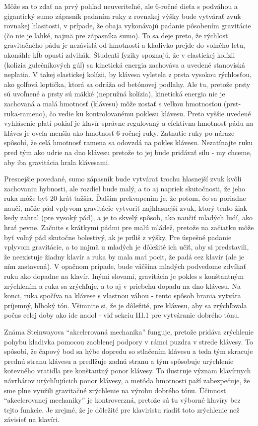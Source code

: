 Môže sa to zdať na prvý pohľad neuveriteľné, ale 6-ročné dieťa s podváhou a gigantický sumo zápasník padaním ruky z rovnakej výšky bude vytvárať zvuk rovnakej hlasitosti, v prípade, že obaja vykonávajú padanie pôsobením gravitácie (čo nie je ľahké, najmä pre zápasníka sumo). To sa deje preto, že rýchlosť gravitačného pádu je nezávislá od hmotnosti a kladivko prejde do voľného letu, akonáhle kĺb opustí zdvihák. Študenti fyziky spoznajú, že v elastickej kolízii (kolízia gulečníkových gúľ) sa kinetická energia zachováva a uvedené stanoviská neplatia. V takej elastickej kolízii, by klávesa vyletela z prsta vysokou rýchlosťou, ako golfová loptička, ktorá sa odráža od betónovej podlahy. Ale tu, pretože prsty sú uvoľnené a prsty sú mäkké (nepružná kolízia), kinetická energia nie je zachovaná a malá hmotnosť (klávesu) môže zostať s veľkou hmotnosťou (prst-ruka-rameno), čo vedie ku  kontrolovanému poklesu klávesu. Preto vyššie uvedené vyhlásenie platí pokiaľ je klavír správne regulovaný a efektívna hmotnosť pádu na kláves je oveľa menšia ako hmotnosť 6-ročnej ruky. Zatnutie ruky po náraze spôsobí, že celá hmotnosť ramena sa odovzdá na pokles klávesu. Nezatínajte ruku pred tým ako udrie na dno klávesu pretože to jej bude pridávať silu - my chceme, aby iba gravitácia hrala klávesami.

Presnejšie povedané, sumo zápasník bude vytvárať trochu hlasnejší zvuk kvôli zachovaniu hybnosti, ale rozdiel bude malý, a to aj napriek skutočnosti, že jeho ruka môže byť 20 krát ťažšia. Ďalším prekvapením je, že potom, čo sa poriadne naučí, môže pád vplyvom gravitácie vytvoriť najhlasnejší zvuk, ktorý tento žiak kedy zahral (pre vysoký pád), a je to skvelý spôsob, ako naučiť mladých ľudí, ako hrať pevne. Začnite s krátkymi pádmi pre malú mládež, pretože na začiatku môže byť voľný pád skutočne bolestivý, ak je príliš  z výšky. Pre úspešné padanie vplyvom gravitácie, a to najmä u mladých je dôležité ich učiť, aby si predstavili, že neexistuje žiadny klavír a ruka by mala mať pocit, že padá cez klavír (ale je ním zastavená). V opačnom prípade, bude väčšina mladých podvedome zdvíhať ruku ako dopadne na klavír. Inými slovami, gravitácia je pokles s konštantným zrýchlením a ruka sa zrýchľuje, a to aj v priebehu dopadu na dno klávesu. Na konci, ruka spočíva na klávese s vlastnou váhou - tento spôsob hrania vytvára príjemný, hlboký tón. Všimnite si, že je dôležité, pre klávesu, aby sa zrýchľovala počas celej doby ako ide nadol - viď sekciu III.1 pre vytváranie dobrého tónu.

Známa Steinwayova “akcelerovaná mechanika” funguje, pretože pridáva zrýchlenie pohybu kladivka pomocou zaoblenej podpory v rámci puzdra v strede klávesy. To spôsobí, že čapový bod sa hýbe dopredu so stlačením klávesu a teda tým skracuje prednú stranu klávesu a predlžuje zadnú stranu a tým spôsobuje urýchlenie kotevného vratidla pre konštantný ponor klávesy. To ilustruje význam klavírnych návrhárov urýchľujúcich ponor klávesy, a metóda hmotnosti paží zabezpečuje, že sme plne využili gravitačné zrýchlenie na výrobu dobrého tónu. Účinnosť “akcelerovanej mechaniky” je kontroverzná, pretože sú tu výborné klavíry bez tejto funkcie. Je zrejmé, že je dôležité pre klaviristu riadiť toto zrýchlenie než závisieť na klavíri.

